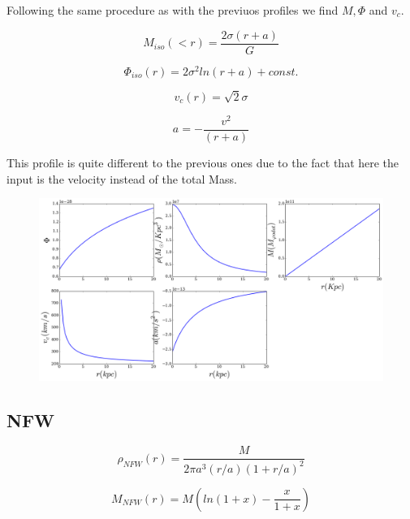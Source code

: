 Following the same procedure as with the previuos profiles we find $M, \Phi$  and $v_c$.

\begin{equation}
M_{iso}(<r) = \dfrac{2 \sigma (r+a)}{G}
\end{equation}

\begin{equation}
\Phi_{iso}(r) = 2 \sigma^2 ln(r+a)  + const.
\end{equation}

\begin{equation}\label{eq:SISv}
v_c(r) = \sqrt{2}\sigma
\end{equation}

\begin{equation}
a = - \dfrac{v^2}{(r+a)}
\end{equation}

This profile is quite different to the previous ones due to the fact that here the input is
the velocity instead of the total Mass.

\begin{figure}[H]
\centering
\includegraphics[scale=0.35]{../figures/sis.png}
\end{figure}




\subsection{NFW}


\begin{equation}\label{eq:rhoNFW}
\rho_{NFW}(r) = \dfrac{M}{2\pi a^3(r/a) (1 + r/a)^2}
\end{equation}


\begin{equation}\label{eq:MNFW}
M_{NFW}(r) =  M  \left(  ln(1 + x) - \frac{x}{1 + x} \right)
\end{equation}

